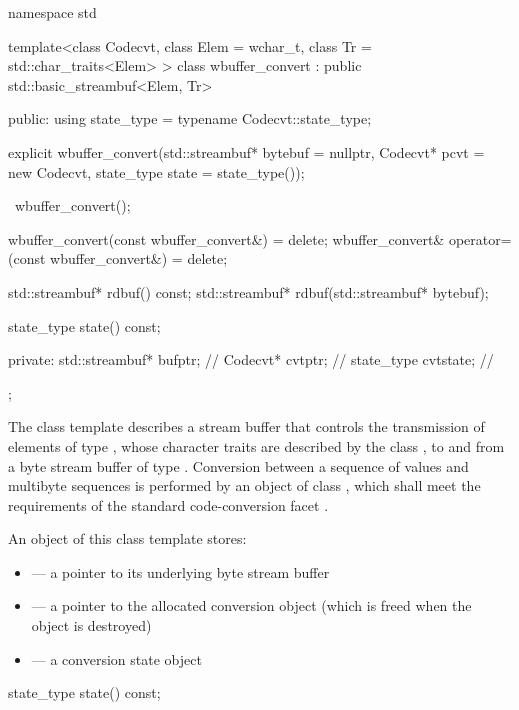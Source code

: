 %
\begin{codeblock}
namespace std {
template<class Codecvt,
    class Elem = wchar_t,
    class Tr = std::char_traits<Elem> >
  class wbuffer_convert
    : public std::basic_streambuf<Elem, Tr> {
  public:
    using state_type = typename Codecvt::state_type;

    explicit wbuffer_convert(std::streambuf* bytebuf = nullptr,
                             Codecvt* pcvt = new Codecvt,
                             state_type state = state_type());

    ~wbuffer_convert();

    wbuffer_convert(const wbuffer_convert&) = delete;
    wbuffer_convert& operator=(const wbuffer_convert&) = delete;

    std::streambuf* rdbuf() const;
    std::streambuf* rdbuf(std::streambuf* bytebuf);

    state_type state() const;

  private:
    std::streambuf* bufptr;         // \expos
    Codecvt* cvtptr;                // \expos
    state_type cvtstate;            // \expos
  };
}
\end{codeblock}

\pnum
The class template describes a stream buffer that controls the
transmission of elements of type , whose character traits are
described by the class , to and from a byte stream buffer of type
. Conversion between a sequence of  values and
multibyte sequences is performed by an object of class
, which shall meet the requirements
of the standard code-conversion facet .

\pnum
An object of this class template stores:

\begin{itemize}
\item {} --- a pointer to its underlying byte stream buffer
\item {} --- a pointer to the allocated conversion object
(which is freed when the  object is destroyed)
\item {} --- a conversion state object
\end{itemize}

%
\begin{itemdecl}
state_type state() const;
\end{itemdecl}

